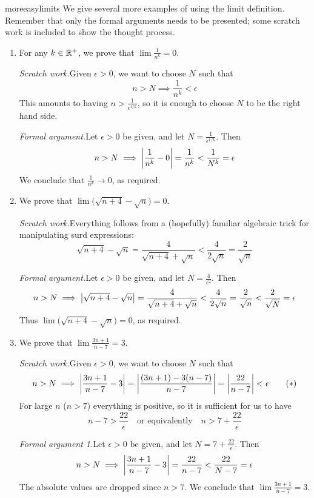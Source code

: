 \begin{examples}{}{moreeasylimits}
	We give several more examples of using the limit definition. Remember that only the formal arguments needs to be presented; some scratch work is included to show the thought process.
	
	\begin{enumerate}
		\item\label{ex:stdzero} For any $k\in\mathbb{R}^+$, we prove that $\lim\frac 1{n^k}=0$.
		\smallbreak
		
		\emph{Scratch work.}\quad Given $\epsilon>0$, we want to choose $N$ such that
		\[n>N\implies \frac 1{n^k}<\epsilon\]
		This amounts to having $n>\frac 1{\epsilon^{1/k}}$, so it is enough to choose $N$ to be the right hand side.
		\smallbreak
		
		\emph{Formal argument.}\quad Let $\epsilon>0$ be given, and let $N=\frac 1{\epsilon^{1/k}}$. Then
		\[
		n>N \implies \left| \frac 1{n^k}-0\right|=\frac 1{n^k}<\frac 1{N^k}=\epsilon
		\]
		We conclude that $\frac 1{n^k}\to 0$, as required.
	
		\goodbreak
		
		
		\item We prove that $\lim \bigl(\sqrt{n+4}-\sqrt n\bigr) =0$.
		\smallbreak
		
		\emph{Scratch work.}\quad Everything follows from a (hopefully) familiar algebraic trick for manipulating surd expressions:
		\[\sqrt{n+4}-\sqrt n=\frac 4{\sqrt{n+4}+\sqrt n} <\frac 4{2\sqrt n}=\frac 2{\sqrt n}\]
		
		\emph{Formal argument.}\quad Let $\epsilon>0$ be given, and let $N=\frac 4{\epsilon^2}$. Then
		\[n>N\implies \left| \sqrt{n+4}-\sqrt n\right|=\frac 4{\sqrt{n+4}+\sqrt n} <\frac 4{2\sqrt n}=\frac 2{\sqrt n}<\frac 2{\sqrt N}=\epsilon\]
		Thus $\lim\bigl(\sqrt{n+4}-\sqrt n\bigr) =0$, as required.

	\item\label{ex:ep2} We prove that $\lim\frac{3n+1}{n-7}=3$.
		\smallbreak
	
		\emph{Scratch work.}\quad Given $\epsilon>0$, we want to choose $N$ such that
		\[n>N\implies \left| \frac{3n+1}{n-7}-3\right|=\left| \frac{(3n+1)-3(n-7)}{n-7}\right|=\left| \frac{22}{n-7}\right|<\epsilon \tag{$\ast$}\]
		For large $n$ ($n>7$) everything is positive, so it is sufficient for us to have
		\[n-7>\frac{22}\epsilon\quad\text{or equivalently}\quad n>7+\frac{22}{\epsilon}\]
		\smallbreak
		
		\emph{Formal argument 1.}\quad Let $\epsilon>0$ be given, and let $N=7+\frac{22}{\epsilon}$. Then
		\[n>N\implies \left| \frac{3n+1}{n-7}-3\right| =\frac{22}{n-7} <\frac{22}{N-7}=\epsilon\]
		The absolute values are dropped since $n>7$. We conclude that $\lim\frac{3n+1}{n-7}=3$.
		\medbreak
		

\end{enumerate}
\end{examples}
